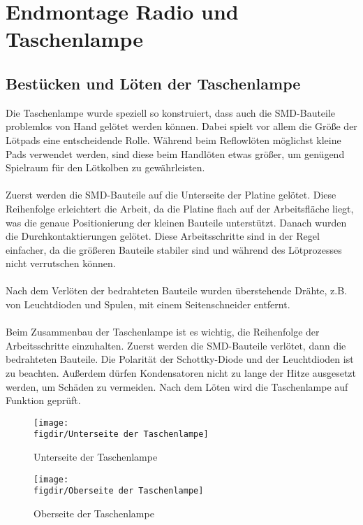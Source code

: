 \section{Endmontage Radio und Taschenlampe}

\subsection{Bestücken und Löten der Taschenlampe}
Die Taschenlampe wurde speziell so konstruiert, dass auch die SMD-Bauteile problemlos von Hand gelötet werden können.
Dabei spielt vor allem die Größe der Lötpads eine entscheidende Rolle.
Während beim Reflowlöten möglichst kleine Pads verwendet werden, sind diese beim Handlöten etwas größer, um genügend Spielraum für den Lötkolben zu gewährleisten.\\
\\
Zuerst werden die SMD-Bauteile auf die Unterseite der Platine gelötet.
Diese Reihenfolge erleichtert die Arbeit, da die Platine flach auf der Arbeitsfläche liegt, was die genaue Positionierung der kleinen Bauteile unterstützt.
Danach wurden die Durchkontaktierungen gelötet.
Diese Arbeitsschritte sind in der Regel einfacher, da die größeren Bauteile stabiler sind und während des Lötprozesses nicht verrutschen können.\\
\\
Nach dem Verlöten der bedrahteten Bauteile wurden überstehende Drähte, z.B. von Leuchtdioden und Spulen, mit einem Seitenschneider entfernt.\\
\\
Beim Zusammenbau der Taschenlampe ist es wichtig, die Reihenfolge der Arbeitsschritte einzuhalten. Zuerst werden die SMD-Bauteile verlötet, dann die bedrahteten Bauteile.
Die Polarität der Schottky-Diode und der Leuchtdioden ist zu beachten.
Außerdem dürfen Kondensatoren nicht zu lange der Hitze ausgesetzt werden, um Schäden zu vermeiden. Nach dem Löten wird die Taschenlampe auf Funktion geprüft.

\begin{figure}[H]
    \centering
    \texttt{[image: \\figdir/Unterseite der Taschenlampe]}
    \caption{Unterseite der Taschenlampe}
    \label{fig: Abbildung 11}
\end{figure}

\begin{figure}[H]
    \centering
    \texttt{[image: \\figdir/Oberseite der Taschenlampe]}
    \caption{Oberseite der Taschenlampe}
    \label{fig:fig: Abbildung 12}
\end{figure}

